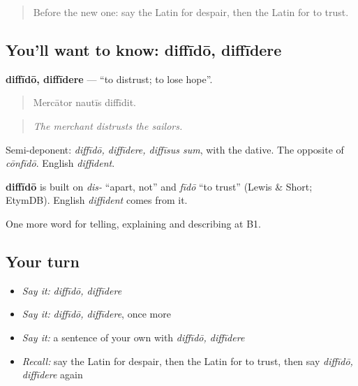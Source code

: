 \label{lesson:LA-C498-diffido}



\begin{quote}
Before the new one: say the Latin for despair, then the Latin for to trust.
\end{quote}

\subsection*{You'll want to know: diffīdō, diffīdere}
\textbf{diffīdō, diffīdere} — \textquotedblleft{}to distrust; to lose hope\textquotedblright{}.

\begin{quote}
Mercātor nautīs diffīdit.
\end{quote}

\begin{quote}
\emph{The merchant distrusts the sailors.}
\end{quote}

Semi-deponent: \emph{diffīdō, diffīdere, diffīsus sum}, with the dative. The opposite of \emph{cōnfīdō}. English \emph{diffident}.

\begin{cousinweb}
\textbf{diffīdō} is built on \emph{dis-} \textquotedblleft{}apart, not\textquotedblright{} and \emph{fīdō} \textquotedblleft{}to trust\textquotedblright{} (Lewis \& Short; EtymDB). English \emph{diffident} comes from it.
\end{cousinweb}

\begin{grammarlens}[title={What you've built}]
One more word for telling, explaining and describing at B1.
\end{grammarlens}

\subsection*{Your turn}
\begin{itemize}
\raggedright
  \item \emph{Say it:} \emph{diffīdō, diffīdere}
  \item \emph{Say it:} \emph{diffīdō, diffīdere}, once more
  \item \emph{Say it:} a sentence of your own with \emph{diffīdō, diffīdere}
  \item \emph{Recall:} say the Latin for despair, then the Latin for to trust, then say \emph{diffīdō, diffīdere} again
\end{itemize}

